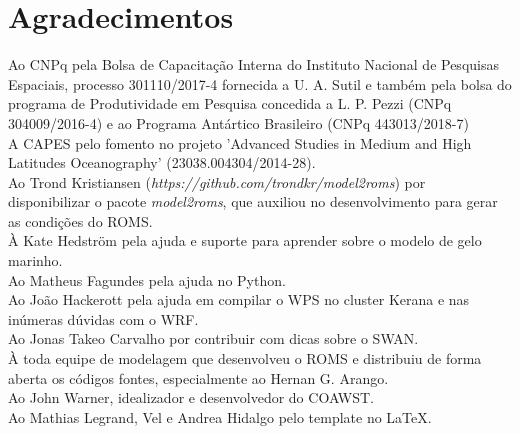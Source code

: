 \chapter*{Agradecimentos}




\noindent Ao CNPq pela Bolsa de Capacitação Interna do Instituto Nacional de Pesquisas Espaciais, processo 301110/2017-4 fornecida a U. A. Sutil e também pela bolsa do programa de Produtividade em Pesquisa concedida a L. P. Pezzi (CNPq 304009/2016-4) e ao Programa Antártico Brasileiro (CNPq 443013/2018-7) \\

\noindent A CAPES pelo fomento no projeto 'Advanced Studies in Medium and High Latitudes Oceanography' (23038.004304/2014-28). \\

\noindent Ao Trond Kristiansen (\textcolor{bleu_cite}{\textit{https://github.com/trondkr/model2roms}}) por disponibilizar o pacote \textit{model2roms}, que auxiliou no desenvolvimento para gerar as condições do ROMS. \\

\noindent À Kate Hedström pela ajuda e suporte para aprender sobre o modelo de gelo marinho. \\

\noindent Ao Matheus Fagundes pela ajuda no Python. \\

\noindent Ao João Hackerott pela ajuda em compilar o WPS no cluster Kerana e nas inúmeras dúvidas com o WRF. \\

\noindent Ao Jonas Takeo Carvalho por contribuir com dicas sobre o SWAN. \\

\noindent À toda equipe de modelagem que desenvolveu o ROMS e distribuiu de forma aberta os códigos fontes, especialmente ao Hernan G. Arango.\\

\noindent Ao John Warner, idealizador e desenvolvedor do COAWST. \\

\noindent Ao Mathias Legrand, Vel e Andrea Hidalgo pelo template no \LaTeX.
